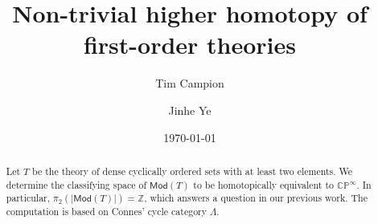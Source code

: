\documentclass{amsart}
\theoremstyle{plain}
\theoremstyle{definition}
\newcommand{\Mod}{\mathsf{Mod}}
\begin{document}
\title{Non-trivial higher homotopy of first-order theories}
\author[T. Campion]{Tim Campion}

\author[J. Ye]{Jinhe Ye}


\date{\today}

\address{Department of Mathematics, John Hopkins University}

\address{Mathematical Institute, University of Oxford}
\begin{abstract}
    Let $T$ be the theory of dense cyclically ordered sets with at least two elements. We determine the classifying space of $\Mod(T)$ to be homotopically equivalent to $\mathbb{CP}^\infty$. In particular, $\pi_2(\lvert\Mod(T)\rvert)=\mathbb{Z}$, which answers a question in our previous work. The computation is based on Connes' cycle category $\Lambda$.
\end{abstract}

\maketitle

\tableofcontents
\end{document}
